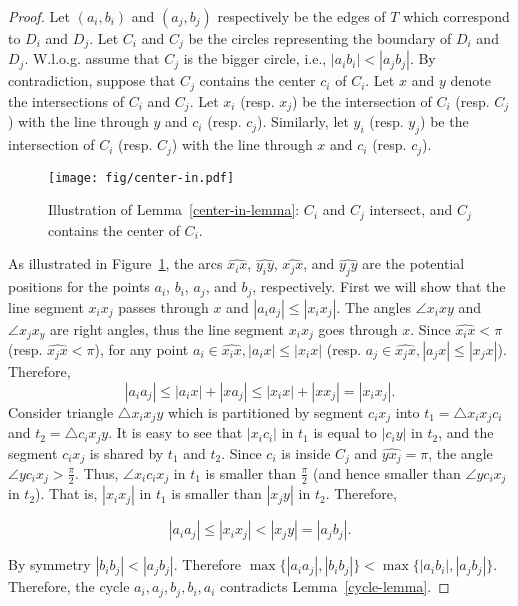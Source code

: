 \documentclass[11pt,a4paper]{article}
\begin{document}
\begin{proof}
 Let $(a_i,b_i)$ and $(a_j,b_j)$ respectively be the edges of $T$ which correspond to $D_i$ and $D_j$. Let $C_i$ and $C_j$ be the circles representing the boundary of $D_i$ and $D_j$. W.l.o.g. assume that $C_j$ is the bigger circle, i.e., $|a_ib_i|<|a_jb_j|$. By contradiction, suppose that $C_j$ contains the center $c_i$ of $C_i$. Let $x$ and $y$ denote the intersections of $C_i$ and $C_j$. Let $x_i$ (resp. $x_j$) be the intersection of $C_i$ (resp. $C_j$) with the line through $y$ and $c_i$ (resp. $c_j$). Similarly, let $y_i$ (resp. $y_j$) be the intersection of $C_i$ (resp. $C_j$) with the line through $x$ and $c_i$ (resp. $c_j$). 

\begin{figure}[htb]
  \centering
  \texttt{[image: fig/center-in.pdf]}
 \caption{Illustration of Lemma~\ref{center-in-lemma}: $C_i$ and $C_j$ intersect, and $C_j$ contains the center of $C_i$.}
  \label{center-in-fig}
\end{figure}

As illustrated in Figure~\ref{center-in-fig}, the arcs $\widehat{x_ix}$, $\widehat{y_iy}$, $\widehat{x_jx}$, and $\widehat{y_jy}$ are the potential positions for the points $a_i$, $b_i$, $a_j$, and $b_j$, respectively. First we will show that the line segment $x_ix_j$ passes through $x$ and $|a_ia_j|\leq|x_ix_j|$. The angles $\angle x_ixy$ and $\angle x_jx_y$ are right angles, thus the line segment $x_ix_j$ goes through $x$. Since $\widehat{x_ix}<\pi$ (resp. $\widehat{x_jx}<\pi$), for any point $a_i\in \widehat{x_ix}, |a_ix|\leq|x_ix|$ (resp. $a_j\in \widehat{x_jx}, |a_jx|\leq|x_jx|$). Therefore, $$|a_ia_j|\leq|a_ix|+|xa_j|\leq|x_ix|+|xx_j|=|x_ix_j|.$$
Consider triangle $\bigtriangleup x_ix_jy$ which is partitioned by segment $c_ix_j$ into $t_1=\bigtriangleup x_ix_jc_i$ and $t_2=\bigtriangleup c_ix_jy$. It is easy to see that $|x_ic_i|$ in $t_1$ is equal to $|c_iy|$ in $t_2$, and the segment $c_ix_j$ is shared by $t_1$ and $t_2$. Since $c_i$ is inside $C_j$ and $\widehat{yx_j}=\pi$, the angle $\angle yc_ix_j>\frac{\pi}{2}$. Thus, $\angle x_ic_ix_j$ in $t_1$ is smaller than $\frac{\pi}{2}$ (and hence smaller than $\angle yc_ix_j$ in $t_2$). That is,  $|x_ix_j|$ in $t_1$ is smaller than $|x_jy|$ in $t_2$. Therefore,

$$|a_ia_j|\leq|x_ix_j|<|x_jy|=|a_jb_j|.$$

By symmetry $|b_ib_j|<|a_jb_j|$. Therefore $\max\{|a_ia_j|,|b_ib_j|\}<\max\{|a_ib_i|,|a_jb_j|\}$. Therefore, the cycle $a_i,a_j,b_j,b_i,a_i$ contradicts Lemma~\ref{cycle-lemma}.
\end{proof}
\end{document}
